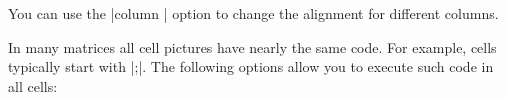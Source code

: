 \begin{codeexample}[]
\end{codeexample}

You can use the |column | option to change the alignment
for different columns.

\begin{codeexample}[]
\end{codeexample}


In many matrices all cell pictures have nearly the same code. For
example, cells typically start with |;|. The
following options allow you to execute such code in all cells:

